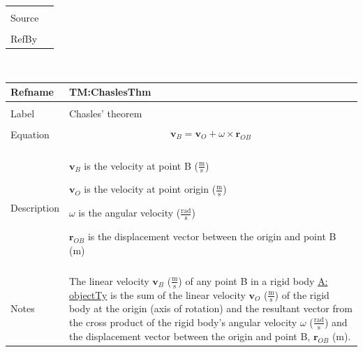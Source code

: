 \documentclass[12pt]{article}
\begin{document}
\begin{minipage}{\textwidth}
\begin{tabular}{p{} p{}}
                                         \\ \midrule \\
                                         Source & \\ \midrule \\
                                                  RefBy & 
\\ \bottomrule \end{tabular}
\end{minipage}
\par~

\noindent \begin{minipage}{\textwidth}
\begin{tabular}{p{} p{}}
\toprule \textbf{Refname} & \textbf{TM:ChaslesThm}
\label{TM:ChaslesThm}
\\ \midrule \\
Label & Chasles' theorem
        \\ \midrule \\
        Equation & \begin{displaymath}
                   {\mathbf{v}_{B}}={\mathbf{v}_{O}}+ω\times{\mathbf{r}_{OB}}
                   \end{displaymath}
                   \\ \midrule \\
                   Description & \begin{symbDescription}
                                 \item{${\mathbf{v}_{B}}$ is the velocity at point B ($\frac{\text{m}}{\text{s}}$)}
                                 \item{${\mathbf{v}_{O}}$ is the velocity at point origin ($\frac{\text{m}}{\text{s}}$)}
                                 \item{$ω$ is the angular velocity ($\frac{\text{rad}}{\text{s}}$)}
                                 \item{${\mathbf{r}_{OB}}$ is the displacement vector between the origin and point B (m)}
                                 \end{symbDescription}
                                 \\ \midrule \\
                                 Notes & The linear velocity ${\mathbf{v}_{B}}$ ($\frac{\text{m}}{\text{s}}$) of any point B in a rigid body \hyperref[A:objectTy]{A: objectTy} is the sum of the linear velocity ${\mathbf{v}_{O}}$ ($\frac{\text{m}}{\text{s}}$) of the rigid body at the origin (axis of rotation) and the resultant vector from the cross product of the rigid body's angular velocity $ω$ ($\frac{\text{rad}}{\text{s}}$) and the displacement vector between the origin and point B, ${\mathbf{r}_{OB}}$ (m).

\end{tabular}
\end{minipage}
\end{document}
